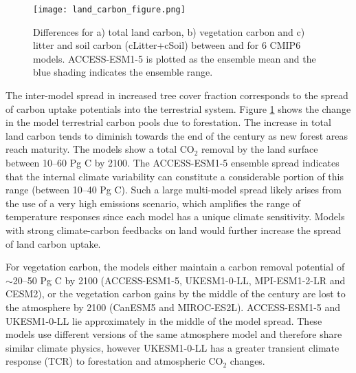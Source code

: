 \documentclass[draft]{agujournal2019}
\begin{document}
\begin{figure}
    \texttt{[image: land\_carbon\_figure.png]}
    \caption{Differences for a) total land carbon, b) vegetation carbon and c) litter and soil carbon (cLitter+cSoil) between  and  for 6 CMIP6 models. ACCESS-ESM1-5 is plotted as the ensemble mean and the blue shading indicates the ensemble range.}
    \label{fig:models_cpools}
\end{figure}

The inter-model spread in increased tree cover fraction corresponds to the spread of carbon uptake potentials into the terrestrial system.
Figure \ref{fig:models_cpools} shows the change in the model terrestrial carbon pools due to forestation.
The increase in total land carbon tends to diminish towards the end of the century as new forest areas reach maturity.
The models show a total CO$_2$ removal by the land surface between 10--60 Pg C by 2100.
The ACCESS-ESM1-5 ensemble spread indicates that the internal climate variability can constitute a considerable portion of this range (between 10--40 Pg C).
Such a large multi-model spread likely arises from the use of a very high emissions scenario, which amplifies the range of temperature responses since each model has a unique climate sensitivity.
Models with strong climate-carbon feedbacks on land would further increase the spread of land carbon uptake.

For vegetation carbon, the models either maintain a carbon removal potential of $\sim$20--50 Pg C by 2100 (ACCESS-ESM1-5, UKESM1-0-LL, MPI-ESM1-2-LR and CESM2), or the vegetation carbon gains by the middle of the century are lost to the atmosphere by 2100 (CanESM5 and MIROC-ES2L).
ACCESS-ESM1-5 and UKESM1-0-LL lie approximately in the middle of the model spread.
These models use different versions of the same atmosphere model and therefore share similar climate physics, however UKESM1-0-LL has a greater transient climate response (TCR) to forestation and atmospheric CO$_2$ changes.
\end{document}
